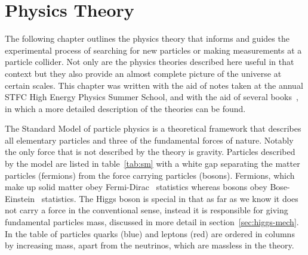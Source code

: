 \chapter{Physics Theory}%
\label{ch:theory}

The following chapter outlines the physics theory that informs and guides the
experimental process of searching for new particles or making measurements at a
particle collider. Not only are the physics theories described here useful in
that context but they also provide an almost complete picture of the universe at
certain scales. This chapter was written with the aid of notes taken at the
annual STFC High Energy Physics Summer School, and with the aid of several
books~\cite{halzen, thomson_2013}, in which a more detailed description of the
theories can be found.

The Standard Model of particle physics is a theoretical framework that describes
all elementary particles and three of the fundamental forces of nature. Notably
the only force that is not described by the theory is gravity. Particles
described by the model are listed in table~\ref{tab:sm} with a white gap
separating the matter particles (fermions) from the force carrying particles
(bosons). Fermions, which make up solid matter obey
Fermi-Dirac~\cite{Fermi-stat, Dirac-stat} statistics whereas bosons obey
Bose-Einstein~\cite{Bose-Einstein} statistics. The Higgs boson is special in
that as far as we know it does not carry a force in the conventional sense,
instead it is responsible for giving fundamental particles mass, discussed in
more detail in section~\ref{sec:higgs-mech}. In the table of particles quarks
(blue) and leptons (red) are ordered in columns by increasing mass, apart from
the neutrinos, which are massless in the theory. 

